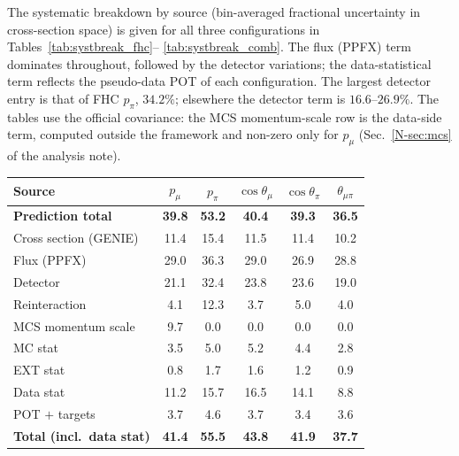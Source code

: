 \documentclass[11pt,a4paper]{article}
\newcommand{\noteref}[2]{#1~\ref{N-#2} of the analysis note}
\begin{document}
The systematic breakdown by source (bin-averaged fractional uncertainty in cross-section
space) is given for all three configurations in Tables~\ref{tab:systbreak_fhc}--%
\ref{tab:systbreak_comb}. The flux (PPFX) term dominates throughout, followed by the
detector variations; the data-statistical term reflects the pseudo-data POT of each
configuration. The largest detector entry is that of FHC $p_\pi$, $34.2\%$; elsewhere the detector
term is $16.6$--$26.9\%$. The tables use the official covariance: the MCS momentum-scale row is the
data-side term, computed outside the framework and non-zero only for $p_\mu$ (\noteref{Sec.}{sec:mcs}).

\begin{center}\scriptsize
{}
\label{tab:systbreak_fhc}
\begin{tabular}{lccccc}
\toprule
Source & $p_\mu$ & $p_\pi$ & $\cos\theta_\mu$ & $\cos\theta_\pi$ & $\theta_{\mu\pi}$ \\
\midrule
\textbf{Prediction total} & \textbf{39.8} & \textbf{53.2} & \textbf{40.4} & \textbf{39.3} & \textbf{36.5} \\
Cross section (GENIE) & 11.4 & 15.4 & 11.5 & 11.4 & 10.2 \\
Flux (PPFX) & 29.0 & 36.3 & 29.0 & 26.9 & 28.8 \\
Detector & 21.1 & 32.4 & 23.8 & 23.6 & 19.0 \\
Reinteraction & 4.1 & 12.3 & 3.7 & 5.0 & 4.0 \\
MCS momentum scale & 9.7 & 0.0 & 0.0 & 0.0 & 0.0 \\
MC stat & 3.5 & 5.0 & 5.2 & 4.4 & 2.8 \\
EXT stat & 0.8 & 1.7 & 1.6 & 1.2 & 0.9 \\
Data stat & 11.2 & 15.7 & 16.5 & 14.1 & 8.8 \\
POT $+$ targets & 3.7 & 4.6 & 3.7 & 3.4 & 3.6 \\
\textbf{Total (incl.\ data stat)} & \textbf{41.4} & \textbf{55.5} & \textbf{43.8} & \textbf{41.9} & \textbf{37.7} \\
\bottomrule
\end{tabular}
\end{center}
\end{document}

